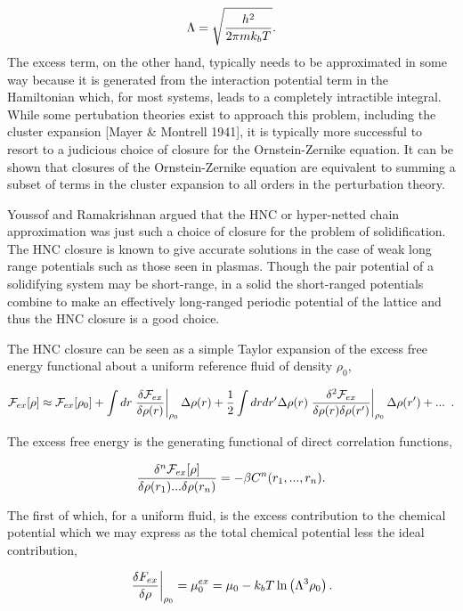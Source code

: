 \begin{equation}
    \Lambda = \sqrt{\frac{h^2}{2\pi m k_b T}}.
\end{equation}
The excess term, on the other hand, typically needs to be approximated in some way because it is generated from the interaction potential term in the Hamiltonian which, for most systems, leads to a completely intractible integral. While some pertubation theories exist to approach this problem, including the cluster expansion [Mayer \& Montrell 1941], it is typically more successful to resort to a judicious choice of closure for the Ornstein-Zernike equation. It can be shown that closures of the Ornstein-Zernike equation are equivalent to summing a subset of terms in the cluster expansion to all orders in the perturbation theory. 

Youssof and Ramakrishnan argued that the HNC or hyper-netted chain approximation was just such a choice of closure for the problem of solidification. The HNC closure is known to give accurate solutions in the case of weak long range potentials such as those seen in plasmas. Though the pair potential of a solidifying system may be short-range, in a solid the short-ranged potentials combine to make an effectively long-ranged periodic potential of the lattice and thus the HNC closure is a good choice.

The HNC closure can be seen as a simple Taylor expansion of the excess free energy functional about a uniform reference fluid of density $\rho_0$,

\begin{equation}
    \mathcal{F}_{ex}[\rho] \approx \mathcal{F}_{ex}[\rho_0] + \int dr \left.\frac{\delta \mathcal{F}_{ex}}{\delta \rho(r)}\right\vert_{\rho_0} \Delta \rho(r) + \frac{1}{2} \int dr dr^\prime 
    \Delta \rho(r)\left.\frac{\delta^2 \mathcal{F}_{ex}}{\delta \rho(r) \delta \rho(r^\prime)}\right\vert_{\rho_0} \Delta \rho(r^\prime) + ... \,\,\,.
\end{equation}

The excess free energy is the generating functional of direct correlation functions, 

\begin{equation}
    \frac{\delta^n \mathcal{F}_{ex}[\rho]}{\delta \rho(r_1) ... \delta \rho(r_n)} = -\beta C^{n}(r_1, ..., r_n).
\end{equation}

The first of which, for a uniform fluid, is the excess contribution to the chemical potential which we may express as the total chemical potential less the ideal contribution, 

\begin{equation}
    \left.\frac{\delta F_{ex}}{\delta \rho}\right\vert_{\rho_0} = \mu_0^{ex} = \mu_0 - k_bT\ln\left(\Lambda^3 \rho_0\right).
\end{equation}

